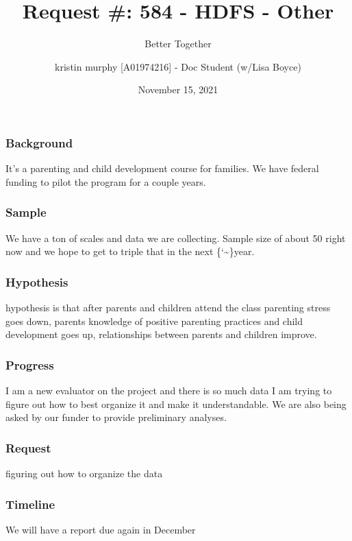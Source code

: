 \documentclass[
]{article}
\title{Request \#: 584 - HDFS - Other}
\subtitle{Better Together}
\author{kristin murphy {[}A01974216{]} - Doc Student (w/Lisa Boyce)}
\date{November 15, 2021}
\begin{document}
\maketitle

\hypertarget{background}{%
\subsubsection{Background}\label{background}}

It's a parenting and child development course for families. We have
federal funding to pilot the program for a couple years.

\hypertarget{sample}{%
\subsubsection{Sample}\label{sample}}

We have a ton of scales and data we are collecting. Sample size of about
50 right now and we hope to get to triple that in the next
\{\char`\textasciitilde\}year.

\hypertarget{hypothesis}{%
\subsubsection{Hypothesis}\label{hypothesis}}

hypothesis is that after parents and children attend the class parenting
stress goes down, parents knowledge of positive parenting practices and
child development goes up, relationships between parents and children
improve.

\hypertarget{progress}{%
\subsubsection{Progress}\label{progress}}

I am a new evaluator on the project and there is so much data I am
trying to figure out how to best organize it and make it understandable.
We are also being asked by our funder to provide preliminary analyses.

\hypertarget{request}{%
\subsubsection{Request}\label{request}}

figuring out how to organize the data

\hypertarget{timeline}{%
\subsubsection{Timeline}\label{timeline}}

We will have a report due again in December
\end{document}

